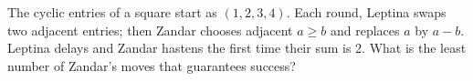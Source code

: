 The cyclic entries of a square start as $(1,2,3,4)$. Each round, Leptina swaps two adjacent entries; then Zandar chooses adjacent $ a\ge b $ and replaces $ a $ by $ a-b $. Leptina delays and Zandar hastens the first time their sum is 2. What is the least number of Zandar's moves that guarantees success?

